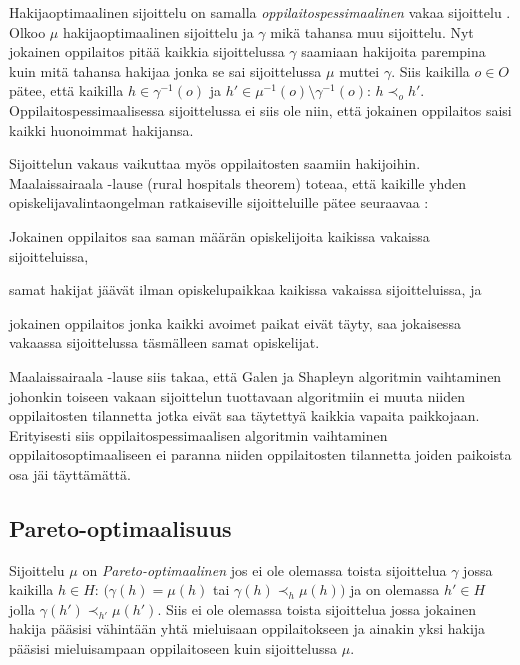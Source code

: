 \documentclass[gradu, twoside]{tktltiki}
\begin{document}
Hakijaoptimaalinen sijoittelu on samalla
\emph{oppilaitospessimaalinen} vakaa sijoittelu \cite{gusfield89}.
Olkoo $\mu$ hakijaoptimaalinen sijoittelu ja $\gamma$ mikä tahansa muu
sijoittelu. Nyt jokainen oppilaitos pitää kaikkia sijoittelussa
$\gamma$ saamiaan hakijoita parempina kuin mitä tahansa hakijaa jonka
se sai sijoittelussa $\mu$ muttei $\gamma$. Siis kaikilla $o \in O$
pätee, että kaikilla $h \in \gamma^{-1}(o)$ ja $h' \in \mu^{-1}(o)
\setminus \gamma^{-1}(o)$: $h \prec_o h'$. Oppilaitospessimaalisessa
sijoittelussa ei siis ole niin, että jokainen oppilaitos saisi kaikki
huonoimmat hakijansa.
\newpage

Sijoittelun vakaus vaikuttaa myös oppilaitosten saamiin hakijoihin.
Maalaissairaala -lause (rural hospitals theorem) toteaa, että kaikille
yhden opiskelijavalintaongelman ratkaiseville sijoitteluille pätee
seuraavaa \cite{gusfield89}:

\begin{itemize*}
  \item Jokainen oppilaitos saa saman määrän opiskelijoita kaikissa
    vakaissa sijoitteluissa,
  \item samat hakijat jäävät ilman opiskelupaikkaa kaikissa vakaissa
    sijoitteluissa, ja
  \item jokainen oppilaitos jonka kaikki avoimet paikat eivät täyty,
    saa jokaisessa vakaassa sijoittelussa täsmälleen samat
    opiskelijat.
\end{itemize*}

Maalaissairaala -lause siis takaa, että Galen ja Shapleyn algoritmin
vaihtaminen johonkin toiseen vakaan sijoittelun tuottavaan algoritmiin
ei muuta niiden oppilaitosten tilannetta jotka eivät saa täytettyä
kaikkia vapaita paikkojaan. Erityisesti siis oppilaitospessimaalisen
algoritmin vaihtaminen oppilaitosoptimaaliseen ei paranna niiden
oppilaitosten tilannetta joiden paikoista osa jäi täyttämättä.

\subsection{Pareto-optimaalisuus}

Sijoittelu $\mu$ on \emph{Pareto-optimaalinen} jos ei ole olemassa
toista sijoittelua $\gamma$ jossa kaikilla $h \in H$: $(\gamma(h) =
\mu(h)$ tai $\gamma(h) \prec_h \mu(h))$ ja on olemassa $h' \in H$
jolla $\gamma(h') \prec_{h'} \mu(h')$. Siis ei ole olemassa toista
sijoittelua jossa jokainen hakija pääsisi vähintään yhtä mieluisaan
oppilaitokseen ja ainakin yksi hakija pääsisi mieluisampaan
oppilaitoseen kuin sijoittelussa $\mu$.
\end{document}
